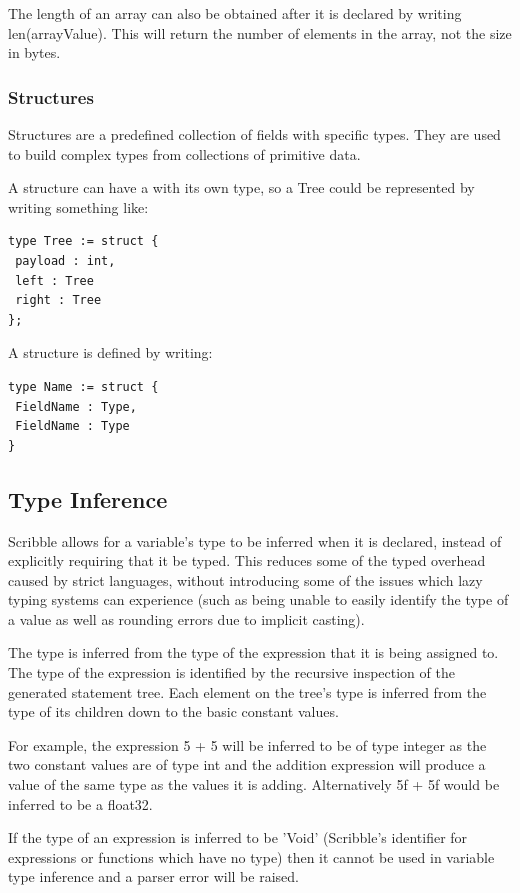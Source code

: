 \documentclass[]{final_report}
\begin{document}
The length of an array can also be obtained after it is declared by writing len(arrayValue). This will return the number of elements in the array, not the size in bytes.

\subsubsection{Structures}

Structures are a predefined collection of fields with specific types. They are used to build complex types from collections of primitive data.

A structure can have a with its own type, so a Tree could be represented by writing something like:\begin{verbatim}
type Tree := struct {
 payload : int, 
 left : Tree
 right : Tree
};
\end{verbatim}

A structure is defined by writing:
\begin{verbatim}
type Name := struct {
 FieldName : Type,
 FieldName : Type
}
\end{verbatim}

\subsection{Type Inference}

Scribble allows for a variable's type to be inferred when it is declared, instead of explicitly requiring that it be typed. This reduces some of the typed overhead caused by strict languages, without introducing some of the issues which lazy typing systems can experience (such as being unable to easily identify the type of a value as well as rounding errors due to implicit casting).

The type is inferred from the type of the expression that it is being assigned to. The type of the expression is identified by the recursive inspection of the generated statement tree. Each element on the tree's type is inferred from the type of its children down to the basic constant values.

For example, the expression 5 + 5 will be inferred to be of type integer as the two constant values are of type int and the addition expression will produce a value of the same type as the values it is adding. Alternatively 5f + 5f would be inferred to be a float32.

If the type of an expression is inferred to be 'Void' (Scribble's identifier for expressions or functions which have no type) then it cannot be used in variable type inference and a parser error will be raised.
\end{document}
